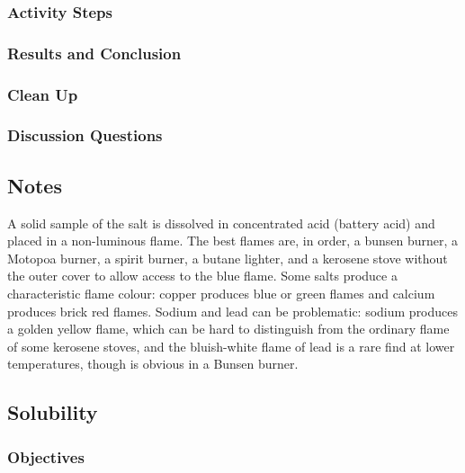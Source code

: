 \subsubsection{Activity Steps}
\begin{enumerate}
\end{enumerate}

\subsubsection{Results and Conclusion}


\subsubsection{Clean Up}
\begin{enumerate}
\end{enumerate}


\subsubsection{Discussion Questions}
\begin{enumerate}
\end{enumerate}

\subsection{Notes}

A solid sample of the salt is dissolved in concentrated acid (battery acid) and placed in a non-luminous flame. 
The best flames are, 
in order, 
a bunsen burner, 
a Motopoa burner,
a spirit burner, 
a butane lighter, 
and a kerosene stove without the outer cover 
to allow access to the blue flame. 
Some salts produce a characteristic flame colour: 
copper produces blue or green flames and calcium produces brick red flames. 
Sodium and lead can be problematic: sodium produces a golden yellow flame, 
which can be hard to distinguish 
from the ordinary flame of some kerosene stoves, 
and the bluish-white flame of lead is a rare find at lower temperatures, 
though is obvious in a Bunsen burner.


\subsection{Solubility}

\subsubsection{Objectives}


